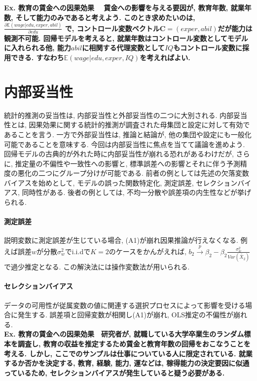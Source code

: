 \documentclass[paper=a4paper,fontsize=10pt]{jlreq}
\begin{document}
\rmfamily\mcfamily\bfseries{Ex. 教育の賃金への因果効果}\mdseries　
賃金への影響を与える要因が, 教育年数, 就業年数, そして能力のみであると考えよう. このとき求めたいのは, $\frac{\partial \mathbb{E}(wage|edu, exper, abil)}{\partial edu}$ で, コントロール変数ベクトル$\mathbf{C}=(exper, abil)$だが能力は\rmfamily\mcfamily\bfseries{観測不可能}\mdseries . 回帰モデルを考えると, 就業年数はコントロール変数としてモデルに入れられる他, 能力$abil$に相関する代理変数として$IQ$もコントロール変数に採用できる. すなわち$\mathbb{E}(wage|edu, exper, IQ)$を考えればよい.\\

\section{内部妥当性} 
統計的推測の妥当性は, 内部妥当性と外部妥当性の二つに大別される. 内部妥当性とは, 因果効果に関する統計的推測が調査された母集団と設定に対して有効であることを言う. 一方で外部妥当性は, 推論と結論が, 他の集団や設定にも一般化可能であることを意味する. 今回は内部妥当性に焦点を当てて議論を進めよう. 回帰モデルの古典的が外れた時に内部妥当性が崩れる恐れがあるわけだが, さらに, 推定量の不偏性や一致性への影響と, 標準誤差への影響とそれに伴う予測精度の悪化の二つにグループ分けが可能である. 前者の例としては先述の欠落変数バイアスを始めとして, モデルの誤った関数特定化, 測定誤差, セレクションバイアス, 同時性がある. 後者の例としては, 不均一分散や誤差項の内生性などが挙げられる.\\

\paragraph{測定誤差}
説明変数に測定誤差が生じている場合, (A1)が崩れ因果推論が行えなくなる. 例えば誤差$w$が分散$\sigma_w^2$でi.i.dで$K=2$のケースをかんがえれば, $b_2 \overset{p}{\to} \beta_2 - \beta_2\frac{\sigma_w^2}{Var(\tilde{X_2})}$ で過少推定となる. この解決法には操作変数法が用いられる. \\

\paragraph{セレクションバイアス}
データの可用性が従属変数の値に関連する選択プロセスによって影響を受ける場合に発生する. 誤差項と回帰変数が相関し(A1)が崩れ, OLS推定の不偏性が崩れる.\\

\rmfamily\mcfamily\bfseries{Ex. 教育の賃金への因果効果}\mdseries　研究者が, 就職している大学卒業生のランダム標本を調査し, 教育の収益を推定するため賃金と教育年数の回帰をおこなうことを考える. しかし, ここでのサンプルは仕事についている人に限定されている. 就業するか否かを決定する, 教育, 経験, 能力, 運などは, 稼得能力の決定要因に似通っているため, セレクションバイアスが発生していると疑う必要がある.\\
\end{document}
